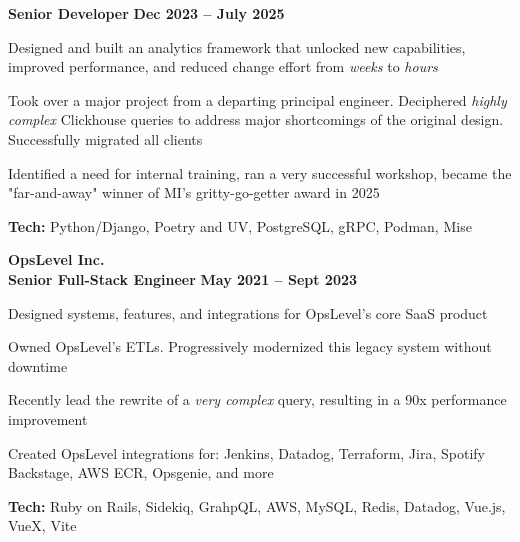 \documentclass[margin,line]{resume}
\begin{document}
\begin{resume}
    \hspace{2.6mm}\textbf{Senior Developer} \hfill \textbf{Dec 2023 -- July 2025}\vspace{1mm}
    \begin{list2}
        \item Designed and built an analytics framework that unlocked new capabilities, improved performance, and reduced change effort from \textit{weeks} to \textit{hours}
        \vspace{1mm}
        \item Took over a major project from a departing principal engineer. Deciphered \textit{highly complex} Clickhouse queries to address major shortcomings of the original design. Successfully migrated all clients
        \vspace{1mm}
        \item Identified a need for internal training, ran a very successful workshop, became the "far-and-away" winner of MI's gritty-go-getter award in 2025
        \vspace{1mm}
        \item\textbf{Tech:} Python/Django, Poetry and UV, PostgreSQL, gRPC, Podman, Mise
    \end{list2}



    \hspace{-3mm}\textbf{\listing OpsLevel Inc.} \vspace{3mm}\\\vspace{1mm}
    \hspace{1.2mm}\textbf{Senior Full-Stack Engineer} \hfill \textbf{May 2021 -- Sept 2023}\vspace{1mm}
    \begin{list2}
        \item Designed systems, features, and integrations for OpsLevel's core SaaS product
        \vspace{1mm}
        \item Owned OpsLevel's ETLs. Progressively modernized this legacy system without downtime
        \vspace{1mm}
        \item Recently lead the rewrite of a \textit{very complex} query, resulting in a 90x performance improvement
        \vspace{1mm}
        \item Created OpsLevel integrations for: Jenkins, Datadog, Terraform, Jira, Spotify Backstage, AWS ECR, Opsgenie, and more
        \vspace{1mm}
        \item\textbf{Tech:} Ruby on Rails, Sidekiq, GrahpQL, AWS, MySQL, Redis, Datadog, Vue.js, VueX, Vite
    \end{list2}


\end{resume}
\end{document}
